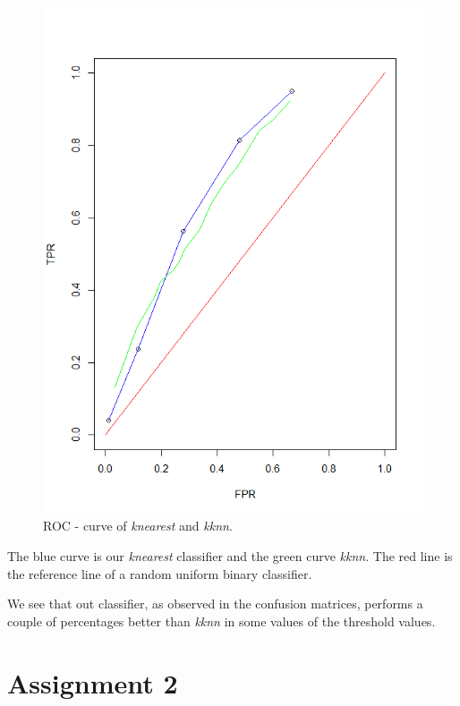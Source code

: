 \documentclass[a4paper,12pt]{article}
\begin{document}
\begin{figure}[H]
\centering
\begin{minipage}[]{0.5\textwidth}
  \includegraphics[width=\textwidth]{figures/Lab1_A1_ROC.png}  
  \caption{ROC - curve of  \textit{knearest} and  \textit{kknn}.\label{fig:ROC - curve} }
 \end{minipage}
\end{figure}
The blue curve is our \textit{knearest} classifier and the green curve \textit{kknn}. The red line is the reference line of a random uniform binary classifier.

We see that out classifier, as observed in the confusion matrices, performs a couple of percentages better than \textit{kknn} in some values of the threshold values.


\section{Assignment 2}
\end{document}
